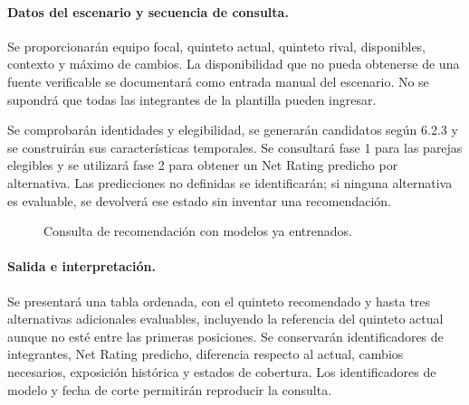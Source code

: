 \paragraph*{Datos del escenario y secuencia de consulta.}
Se proporcionarán equipo focal, quinteto actual, quinteto rival, disponibles, contexto y máximo de cambios. La disponibilidad que no pueda obtenerse de una fuente verificable se documentará como entrada manual del escenario. No se supondrá que todas las integrantes de la plantilla pueden ingresar.

Se comprobarán identidades y elegibilidad, se generarán candidatos según 6.2.3 y se construirán sus características temporales. Se consultará fase 1 para las parejas elegibles y se utilizará fase 2 para obtener un Net Rating predicho por alternativa. Las predicciones no definidas se identificarán; si ninguna alternativa es evaluable, se devolverá ese estado sin inventar una recomendación.

\begin{figure}[htbp]
\centering
{}
\caption{Consulta de recomendación con modelos ya entrenados.}
\end{figure}

\paragraph*{Salida e interpretación.}
Se presentará una tabla ordenada, con el quinteto recomendado y hasta tres alternativas adicionales evaluables, incluyendo la referencia del quinteto actual aunque no esté entre las primeras posiciones. Se conservarán identificadores de integrantes, Net Rating predicho, diferencia respecto al actual, cambios necesarios, exposición histórica y estados de cobertura. Los identificadores de modelo y fecha de corte permitirán reproducir la consulta.

